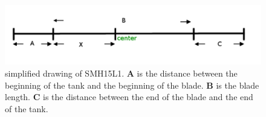 \documentclass[11pt,letter,english]{article}
\begin{document}
\begin{figure}[!hbtp]
  \begin{center}
    \includegraphics[width=1.0\textwidth]{figs/smh15l1.pdf}
    \caption{simplified drawing of SMH15L1. {\bf A} is the distance between the beginning of the tank and the beginning of the blade. {\bf B} is the blade length. 
      {\bf C} is the distance between the end of the blade and the end of the tank.}
    \label{fig:smh15l1_simplified}
  \end{center}
\end{figure}
\end{document}
